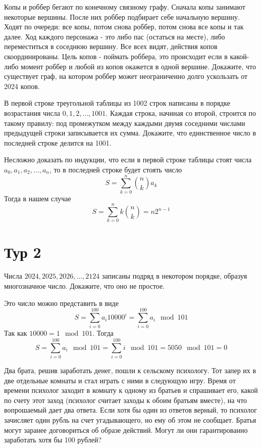 \documentclass[11pt, a4paper]{problems_template}
\begin{document}
\begin{exercise}
Копы и роббер бегают по конечному связному графу. Сначала копы занимают некоторые вершины. После них роббер подбирает себе начальную вершину. Ходят по очереди: все копы, потом снова роббер, потом снова все копы и так далее. Ход каждого персонажа - это либо пас (остаться на месте), либо переместиться в соседнюю вершину. Все всех видят, действия копов скоординированы. Цель копов - поймать
роббера, это происходит если в какой-либо момент роббер и любой из копов окажется в одной вершине. Докажите, что существует граф, на котором роббер может неограниченно долго ускользать от 2024 копов.
\end{exercise}


\begin{exercise}
В первой строке треугольной таблицы из 1002 строк написаны в порядке возрастания числа $0, 1, 2, \dots, 1001$. Каждая строка, начиная со второй, строится по такому правилу: под промежутком между каждыми двумя соседними числами предыдущей строки записывается их сумма. Докажите, что единственное число в последней строке делится на 1001.
\end{exercise}

\begin{Solution}
Несложно доказать по индукции, что если в первой строке таблицы стоят числа $a_{0}, a_{1}, a_{2}, \dots, a_{n}$, то в последней строке будет стоять число
$$
S = \sum_{k = 0}^{n} \binom{n}{k} a_{k}
$$
Тогда в нашем случае
$$
S = \sum_{k = 0}^{n} k \binom{n}{k} = n 2^{n - 1}
$$
\end{Solution}

\section{Тур 2}

\begin{exercise}
Числа $2024, 2025, 2026, \dots, 2124$ записаны подряд в некотором порядке, образуя многозначное число. Докажите, что оно не простое.
\end{exercise}

\begin{Solution}
Это число можно представить в виде
$$
S = \sum_{i = 0}^{100} a_{i} 10000^{i} = \sum_{i = 0}^{100} a_{i} \mod 101
$$
Так как $10000 = 1 \mod 101$. Тогда 
$$
S = \sum_{i = 0}^{100} a_{i} \mod 101 =  \sum_{i = 0}^{100} i \mod 101 = 5050 \mod 101 = 0
$$
\end{Solution}

\begin{exercise}
Два брата, решив заработать денег, пошли к сельскому психологу. Тот запер их в две отдельные комнаты и стал играть с ними в следующую игру. Время от времени психолог заходит в комнату к одному из братьев и спрашивает его, какой по счету этот заход (психолог считает заходы к обоим братьям вместе), на что вопрошаемый дает два ответа. Если хотя бы один из ответов верный, то психолог зачисляет один рубль на счет угадывающего, но ему об этом не сообщает. Братья
могут заранее договориться об образе действий. Могут ли они гарантированно заработать хотя бы 100 рублей?
\end{exercise}
\end{document}

